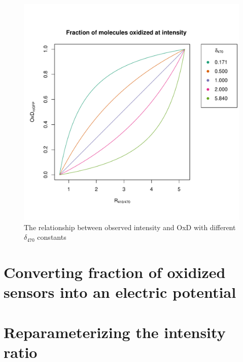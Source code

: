 \documentclass{article}
\begin{document}
\begin{figure}[h]
    \centering
    \includegraphics[page=1,width=.75\textwidth]{plot1.pdf}
    \caption{The relationship between observed intensity and OxD with different $\delta_{470}$ constants}
    \label{fig:my_label}
\end{figure}


\FloatBarrier

\section{Converting fraction of oxidized sensors into an electric potential}


\section{Reparameterizing the intensity ratio}
\end{document}
